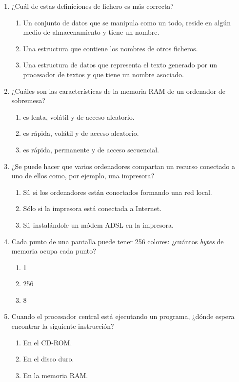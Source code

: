 \begin{enumerate}
\item ¿Cuál de estas definiciones de fichero es más correcta? \begin{enumerate} \item Un conjunto de datos que se manipula como un todo, reside en algún medio de almacenamiento y tiene un nombre. \item Una estructura que contiene los nombres de otros ficheros. \item Una estructura de datos que representa el texto generado por un procesador de textos y que tiene un nombre asociado. \end{enumerate} 

\item ¿Cuáles son las características de la memoria RAM de un ordenador de sobremesa? \begin{enumerate} \item es lenta, volátil y de acceso aleatorio. \item es rápida, volátil y de acceso aleatorio. \item es rápida, permanente y de acceso secuencial. \end{enumerate} 

\item ¿Se puede hacer que varios ordenadores compartan un recurso conectado a uno de ellos como, por ejemplo, una impresora? \begin{enumerate} \item Sí, si los ordenadores están conectados formando una red local. \item Sólo si la impresora está conectada a Internet. \item Sí, instalándole un módem ADSL en la impresora. \end{enumerate} 

\item Cada punto de una pantalla puede tener 256 colores: ¿cuántos \emph{bytes} de memoria ocupa cada punto? \begin{enumerate} \item 1 \item 256 \item 8 \end{enumerate} 

\item Cuando el procesador central está ejecutando un programa, ¿dónde espera encontrar la siguiente instrucción? \begin{enumerate} \item En el CD-ROM. \item En el disco duro. \item En la memoria RAM. \end{enumerate} 


\end{enumerate}
